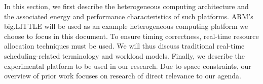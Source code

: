 In this section, we first describe the heterogeneous computing
architecture and the associated energy and performance characteristics
of such platforms. ARM's big.LITTLE will be used as an example
heterogeneous computing platform we choose to focus in this
document. To ensure timing correctness, real-time resource allocation
techniques must be used. We will thus discuss traditional real-time
scheduling-related terminology and workload models. Finally, we
describe the experimental platform to be used in our research. Due to
space constraints, our overview of prior work focuses on research of
direct relevance to our agenda.
